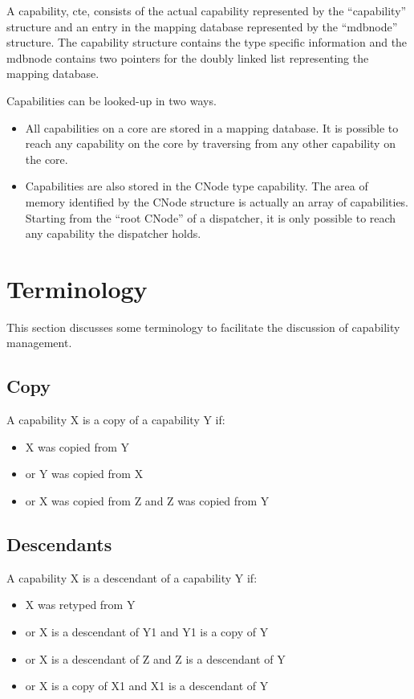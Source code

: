 \documentclass[a4paper,twoside]{report} %
\begin{document}
A capability, cte, consists of the actual capability represented by
the ``capability'' structure and an entry in the mapping database
represented by the ``mdbnode'' structure. The capability structure
contains the type specific information and the mdbnode contains two
pointers for the doubly linked list representing the mapping database.

Capabilities can be looked-up in two ways.
\begin{itemize}
\item All capabilities on a core are stored in a mapping database. It
  is possible to reach any capability on the core by traversing from
  any other capability on the core.

\item Capabilities are also stored in the CNode type capability. The
  area of memory identified by the CNode structure is actually an
  array of capabilities. Starting from the ``root CNode'' of a
  dispatcher, it is only possible to reach any capability the
  dispatcher holds.
\end{itemize}

\section{Terminology}

This section discusses some terminology to facilitate the discussion
of capability management.

\subsection{Copy}

A capability X is a copy of a capability Y if:

\begin{itemize}
\item X was copied from Y
\item or Y was copied from X
\item or X was copied from Z and Z was copied from Y
\end{itemize}

\subsection{Descendants}

A capability X is a descendant of a capability Y if:

\begin{itemize}
\item X was retyped from Y

\item or X is a descendant of Y1 and Y1 is a copy of Y

\item or X is a descendant of Z and Z is a descendant of Y

\item or X is a copy of X1 and X1 is a descendant of Y
\end{itemize}
\end{document}

